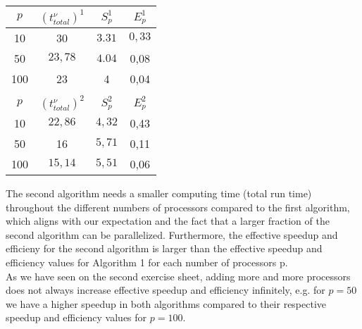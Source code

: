 \documentclass{article}
\begin{document}
\begin{enumerate}[label=(\alph*)]
\begin{center}
\begin{tabular}{ c | c | c | c } 
  $p$ & $(t_{total}^\nu)^1$ & $S_p^1$ & $E_p^1$ \\
  \hline
  10    &    30             &   $3.31$  &   $ 0,33$    \\
  50    &    $23,78$    &   $ 4.04$ &   0,08    \\
  100   &    23             &   4           &   0,04    \\
  \\
  $p$ & $(t_{total}^\nu)^2$ & $S_p^2$ & $E_p^2$ \\
  \hline
  10    &    $22,86$    &   $ 4,32$ &      0,43 \\
  50    &    16             &   $ 5,71$ &  0,11     \\
  100   &    $15,14$    &   $ 5,51$ &       0,06    \\
\end{tabular}        
    \end{center}

The second algorithm needs a smaller computing time (total run time) throughout the different numbers of processors compared to the first algorithm, which aligns with our expectation and the fact that a larger fraction of the second algorithm can be parallelized. Furthermore, the effective speedup and efficieny for the second algorithm is larger than the effective speedup and efficiency values for Algorithm 1 for each number of processors p.\\
As we have seen on the second exercise sheet, adding more and more processors does not always increase effective speedup and efficiency infinitely, e.g. for $p=50$ we have a higher speedup in both algorithms compared to their respective speedup and efficiency values for $p=100$.
\end{enumerate} 
\end{document}
